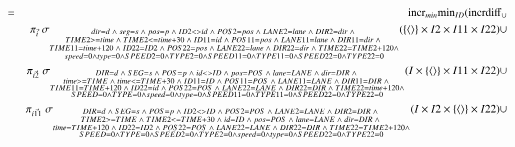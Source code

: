 \begin{eqnarray*}
%
&=& \algincr_{min} \algmin_{ID} (\algincrdiff_{\cup} \\
&& \pi_{\vec{i}} \;\sigma_{ \substack{dir = d \;\wedge\; seg = s \;\wedge\; pos = p \;\wedge\; ID2 <> id \;\wedge\; POS2 = pos \;\wedge\; LANE2 = lane \;\wedge\; DIR2 = dir \;\wedge\; \\ TIME2 >= time \;\wedge\; TIME2 <= time + 30 \;\wedge\; ID11 = id \;\wedge\; POS11 = pos \;\wedge\;  LANE11 = lane \;\wedge\; DIR11= dir \;\wedge\; \\TIME11 = time + 120 \;\wedge\; ID22 = ID2 \;\wedge\; POS22 = pos \;\wedge\;  LANE22 = lane \;\wedge\; DIR22 = dir \;\wedge\; TIME22 = TIME2 + 120 \wedge \\ speed = 0 \wedge type = 0 \wedge SPEED2 = 0 \wedge TYPE2 = 0 \wedge  SPEED11 = 0 \wedge TYPE11 = 0 \wedge SPEED22 = 0 \wedge TYPE22 =0 }}(  \{\tuple{} \} \times I2 \times I11 \times I22) \cup \\
&& \pi_{\vec{i2}} \;\sigma_{\substack{DIR = d \;\wedge\; SEG = s \;\wedge\; POS = p \;\wedge\; id <> ID \;\wedge\; pos = POS \;\wedge\; lane = LANE \;\wedge\; dir = DIR \;\wedge\; \\ time >= TIME \;\wedge\; time <= TIME + 30 \;\wedge\; ID11 = ID \;\wedge\; POS11 = POS \;\wedge\;  LANE11 = LANE \;\wedge\; DIR11=DIR \;\wedge\; \\TIME11 = TIME + 120 \;\wedge\; ID22 = id \;\wedge\; POS22 = POS \;\wedge\;  LANE22 = LANE \;\wedge\; DIR22 = DIR \;\wedge\; TIME22 = time + 120 \wedge \\SPEED = 0 \wedge TYPE = 0 \wedge speed = 0 \wedge type = 0 \wedge  SPEED11 = 0 \wedge TYPE11 = 0 \wedge SPEED22 = 0 \wedge TYPE22 =0 }}(I \times \{\tuple{} \} \times I11 \times I22) \cup \\
&& \pi_{\vec{i11}} \;\sigma_{\substack{DIR = d \;\wedge\; SEG = s \;\wedge\; POS = p \;\wedge\; ID2 <> ID \;\wedge\; POS2 = POS \;\wedge\; LANE2 = LANE \;\wedge\; DIR2 = DIR \;\wedge\; \\ TIME2 >= TIME \;\wedge\; TIME2 <= TIME + 30 \;\wedge\; id = ID \;\wedge\; pos = POS \;\wedge\;  lane = LANE \;\wedge\; dir=DIR \;\wedge\; \\time = TIME + 120 \;\wedge\; ID22 = ID2 \;\wedge\; POS22 = POS \;\wedge\;  LANE22 = LANE \;\wedge\; DIR22 = DIR \;\wedge\; TIME22 = TIME2 + 120 \wedge \\SPEED = 0 \wedge TYPE = 0 \wedge SPEED2 = 0 \wedge TYPE2 = 0 \wedge  speed = 0 \wedge type = 0 \wedge SPEED22 = 0 \wedge TYPE22 =0 }}(I \times  I2 \times  \{\tuple{} \} \times I22) \cup \\

\end{eqnarray*}
